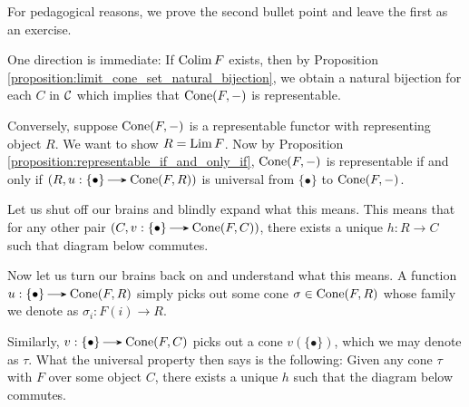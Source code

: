     \begin{prf}
        For pedagogical reasons, we prove the second bullet point and leave the first as 
        an exercise. 

        One direction is immediate: If $\operatorname*{\mathrm{Colim }} F$ exists, 
        then by Proposition \ref{proposition:limit_cone_set_natural_bijection}, 
        we obtain a natural bijection for each $C$ in $\mathcal{C}$ 
        which implies that $\operatorname{\mathrm{Cone}}(F, -)$ is representable.

        Conversely, suppose $\operatorname{\mathrm{Cone}}(F, -)$ is a representable functor with representing object 
        $R$. We want to show $R = \operatorname*{\mathrm{Lim }} F$. 
        Now by Proposition \ref{proposition:representable_if_and_only_if}, 
        $\operatorname{\mathrm{Cone}}(F, -)$ is representable if and only if $(R, u: \{\bullet\} \to \cone(F, R))$ 
        is universal from $\{\bullet\}$ to $\operatorname{\mathrm{Cone}}(F, -)$. 

        Let us shut off our brains and
        blindly expand what this means. This means that for any other 
        pair $(C, v: \{\bullet\} \to \cone(F, C))$, there exists a unique $h: R \to C$ such that 
        diagram below commutes. 

        \begin{center}
            \hspace{1cm}
        \end{center}

        Now let us turn our brains back on and understand what this means. 
        A function $u: \{\bullet\} \to \cone(F, R)$ simply picks out some
        cone $\sigma \in \operatorname{\mathrm{Cone}}(F, R)$ whose family we denote as
        $\sigma_i: F(i) \to R$.

        Similarly, $v: \{\bullet\} \to \cone(F, C)$ picks out a cone $v(\{\bullet\})$, which 
        we may denote as $\tau$. 
        What the universal property then says is the following: Given any cone $\tau$
        with $F$ over some object $C$, there exists a unique $h$ such that the diagram below commutes. 


\end{prf}
